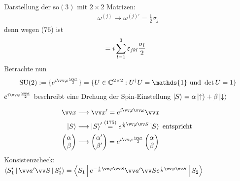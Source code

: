 \documentclass[a4paper]{scrartcl}
\newcommand{\CC}{\ensuremath \mathbb{C}}
\newcommand{\dOne}{\ensuremath \mathds{1}}
\newcommand{\eps}{\ensuremath \varepsilon}
\renewcommand{\phi}{\ensuremath \varphi}
\newcommand{\matr}[1]{\begin{pmatrix} #1 \end{pmatrix}}
\newcommand{\eqn}[1]{\begin{align} #1 \end{align}}
\newcommand{\eqnnon}[1]{\begin{align*} #1 \end{align*}}
\begin{document}
{Darstellung der $\mathrm{so}(3)$ mit $2 \times 2$ Matrizen:
\eqn{ \omega^{(j)} \longrightarrow \omega^{(j)'} = \frac 12 \sigma_j }
denn wegen (76) ist 
\eqnnon{[\frac 12 \sigma_j, \frac 12 \sigma_k ] & = i \sum_{l=1}^3 \eps_{jkl}  \frac{\sigma_l}2}
Betrachte nun
\eqn{ \mathrm{SU}(2) := \{ e^{i \vv \phi \frac{ \vv \sigma}2 } \} = \{ U \in \CC^{2 \times 2}: U^\dagger U = \dOne \mathrm{ \ und \ } \det U =1 \} }
$e^{i \vv \phi \frac{ \vv \sigma}2}$ beschreibt eine Drehung der Spin-Einstellung $ \Ket S = \alpha \Ket \uparrow + \beta \Ket \downarrow$

\eqn{
\begin{split}
\vv x & \longrightarrow \vv x' = e^{i \vv \phi \vv \omega} \vv x \\
\Ket S & \longrightarrow \Ket S' \stackrel{(175)}= e^{ \frac i \hbar \vv \phi \vv S} \Ket S \mathrm{\ entspricht \ } \\
\matr{ \alpha \\ \beta } & \longrightarrow \matr{ \alpha' \\ \beta' } = e^{i \vv \phi \frac{ \vv \sigma}2} \matr{ \alpha \\ \beta }
\end{split}
}
Konsistenzcheck: $\Braket{ S_1' | \vv a' \vv S | S_2'} = \Braket{ S_1 | e^{- \frac i \hbar \vv \phi \vv S} \vv a' \vv S e^{\frac i \hbar \vv \phi \vv S} | S_2}$

}
\end{document}
